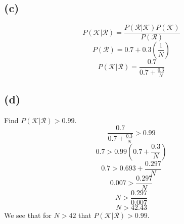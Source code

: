 \documentclass[11pt]{article}
\begin{document}
\subsection*{(c)}
\[P(\mathcal{K}|\mathcal{R})=\frac{P(\mathcal{R}|\mathcal{K})P(\mathcal{K})}{P(\mathcal{R})}\]
\[P(\mathcal{R})=0.7+0.3\left(\frac{1}{N}\right)\]
\[P(\mathcal{K}|\mathcal{R})=\frac{0.7}{0.7+\frac{0.3}{N}}\]
\subsection*{(d)}
Find $P(\mathcal{K}|\mathcal{R})>0.99$.
\[\frac{0.7}{0.7+\frac{0.3}{N}}>0.99\]
\[0.7>0.99\left(0.7+\frac{0.3}{N}\right)\]
\[0.7>0.693+\frac{0.297}{N}\]
\[0.007>\frac{0.297}{N}\]
\[N>\frac{0.297}{0.007}\]
\[N>42.43\]
We see that for $N>42$ that $P(\mathcal{K}|\mathcal{R})>0.99$.
\end{document}
